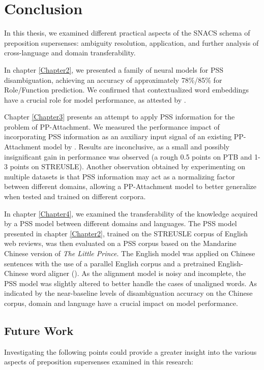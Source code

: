 \chapter{Conclusion}
\label{Conclusions}
In this thesis, we examined different practical aspects of the SNACS schema of preposition supersenses: ambiguity resolution, application, and further analysis of cross-language and domain transferability. 

In chapter \ref{Chapter2}, we presented a family of neural models for PSS disambiguation, achieving an accuracy of approximately 78\%/85\% for Role/Function prediction. We confirmed that contextualized word embeddings have a crucial role for model performance, as attested by \cite{nelson}. 

Chapter \ref{Chapter3} presents an attempt to apply PSS information for the problem of PP-Attachment. We measured the performance impact of incorporating PSS information as an auxiliary input signal of an existing PP-Attachment model by \cite{hpcd}. Results are inconclusive, as a small and possibly insignificant gain in performance was observed (a rough 0.5 points on PTB and 1-3 points on STREUSLE). Another observation obtained by experimenting on multiple datasets is that PSS information may act as a normalizing factor between different domains, allowing a PP-Attachment model to better generalize when tested and trained on different corpora. 

In chapter \ref{Chapter4}, we examined the transferability of the knowledge acquired by a PSS model between different domains and languages. The PSS model presented in chapter \ref{Chapter2}, trained on the STREUSLE corpus of English web reviews, was then evaluated on a PSS corpus based on the Mandarine Chinese version of \textit{The Little Prince}. The English model was applied on Chinese sentences with the use of a parallel English corpus and a pretrained English-Chinese word aligner (\cite{liu2014contrastive}). As the alignment model is noisy and incomplete, the PSS model was slightly altered to better handle the cases of unaligned words. As indicated by the near-baseline levels of disambiguation accuracy on the Chinese corpus, domain and language have a crucial impact on model performance. 

\section{Future Work}

Investigating the following points could provide a greater insight into the various aspects of preposition supersenses examined in this research:

